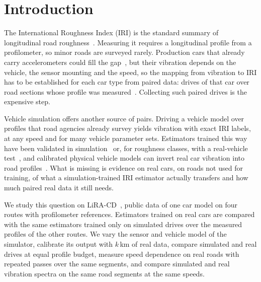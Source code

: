 \section{Introduction}
\label{sec:intro}
The International Roughness Index (IRI) is the standard summary of longitudinal road roughness~\cite{sayers1986tp45,astm_e1926}.
Measuring it requires a longitudinal profile from a profilometer, so minor roads are surveyed rarely.
Production cars that already carry accelerometers could fill the gap~\cite{sattar2018review,sang2024iri,levenberg2021lira}, but their vibration depends on the vehicle, the sensor mounting and the speed, so the mapping from vibration to IRI has to be established for each car type from paired data: drives of that car over road sections whose profile was measured~\cite{sayers1986tp46}.
Collecting such paired drives is the expensive step.

Vehicle simulation offers another source of pairs.
Driving a vehicle model over profiles that road agencies already survey yields vibration with exact IRI labels, at any speed and for many vehicle parameter sets.
Estimators trained this way have been validated in simulation~\cite{jeong2020cnn,rcnn2023sim} or, for roughness classes, with a real-vehicle test~\cite{speedadaptive2025}, and calibrated physical vehicle models can invert real car vibration into road profiles~\cite{skar2024inversion,agebjar2025fusion}.
What is missing is evidence on real cars, on roads not used for training, of what a simulation-trained IRI estimator actually transfers and how much paired real data it still needs.

We study this question on LiRA-CD~\cite{skar2023lira}, public data of one car model on four routes with profilometer references.
Estimators trained on real cars are compared with the same estimators trained only on simulated drives over the measured profiles of the other routes.
We vary the sensor and vehicle model of the simulator, calibrate its output with $k$\,km of real data, compare simulated and real drives at equal profile budget, measure speed dependence on real roads with repeated passes over the same segments, and compare simulated and real vibration spectra on the same road segments at the same speeds.

